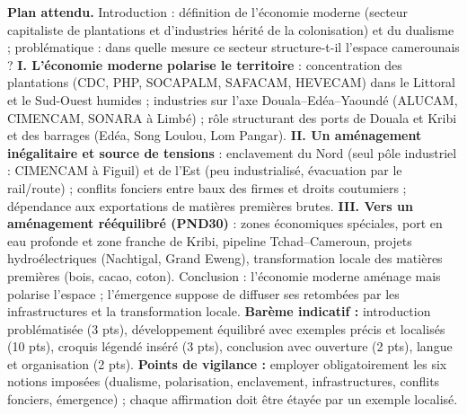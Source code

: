 \documentclass[11pt]{article}
\newcommand{\cle}[1]{{\popxbold\color{popdark}#1}}
\begin{document}
\begin{corrige}
\textbf{Plan attendu.} Introduction : définition de l'économie moderne (secteur capitaliste de plantations et d'industries hérité de la colonisation) et du \cle{dualisme} ; problématique : dans quelle mesure ce secteur structure-t-il l'espace camerounais ?
\textbf{I. L'économie moderne polarise le territoire} : concentration des plantations (CDC, PHP, SOCAPALM, SAFACAM, HEVECAM) dans le Littoral et le Sud-Ouest humides ; industries sur l'axe Douala--Edéa--Yaoundé (ALUCAM, CIMENCAM, SONARA à Limbé) ; rôle structurant des ports de Douala et Kribi et des barrages (Edéa, Song Loulou, Lom Pangar).
\textbf{II. Un aménagement inégalitaire et source de tensions} : \cle{enclavement} du Nord (seul pôle industriel : CIMENCAM à Figuil) et de l'Est (peu industrialisé, évacuation par le rail/route) ; \cle{conflits fonciers} entre baux des firmes et droits coutumiers ; dépendance aux exportations de matières premières brutes.
\textbf{III. Vers un aménagement rééquilibré (PND30)} : zones économiques spéciales, port en eau profonde et zone franche de Kribi, pipeline Tchad--Cameroun, projets hydroélectriques (Nachtigal, Grand Eweng), transformation locale des matières premières (bois, cacao, coton).
Conclusion : l'économie moderne aménage mais \cle{polarise} l'espace ; l'\cle{émergence} suppose de diffuser ses retombées par les \cle{infrastructures} et la transformation locale.
\textbf{Barème indicatif :} introduction problématisée (3 pts), développement équilibré avec exemples précis et localisés (10 pts), croquis légendé inséré (3 pts), conclusion avec ouverture (2 pts), langue et organisation (2 pts).
\textbf{Points de vigilance :} employer obligatoirement les six notions imposées (\cle{dualisme}, \cle{polarisation}, \cle{enclavement}, \cle{infrastructures}, \cle{conflits fonciers}, \cle{émergence}) ; chaque affirmation doit être étayée par un exemple localisé.
\end{corrige}
\end{document}
